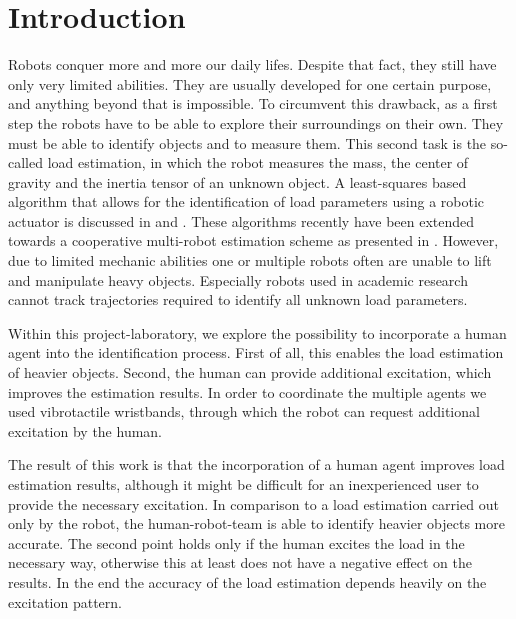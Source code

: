 \chapter{Introduction}
Robots conquer more and more our daily lifes. Despite that fact, they still have only very limited abilities. They are usually developed for one certain purpose, and anything beyond that is impossible. To circumvent this drawback, as a first step the robots have to be able to explore their surroundings on their own. They must be able to identify objects and to measure them. This second task is the so-called load estimation, in which the robot measures the mass, the center of gravity and the inertia tensor of an unknown object. A least-squares based algorithm that allows for the identification of load parameters using a robotic actuator is discussed in \cite{literaturstelle1} and \cite{literaturstelle2}. These algorithms recently have been extended towards a cooperative multi-robot estimation scheme as presented in \cite{literaturstelle3}. However, due to limited mechanic abilities one or multiple robots often are unable to lift and manipulate heavy objects. Especially robots used in academic research cannot track trajectories required to identify all unknown load parameters.

Within this project-laboratory, we explore the possibility to incorporate a human agent into the identification process. First of all, this enables the load estimation of heavier objects. Second, the human can provide additional excitation, which improves the estimation results. In order to coordinate the multiple agents we used vibrotactile wristbands, through which the robot can request additional excitation by the human.

The result of this work is that the incorporation of a human agent improves load estimation results, although it might be difficult for an inexperienced user to provide the necessary excitation. In comparison to a load estimation carried out only by the robot, the human-robot-team is able to identify heavier objects more accurate. The second point holds only if the human excites the load in the necessary way, otherwise this at least does not have a negative effect on the results. In the end the accuracy of the load estimation depends heavily on the excitation pattern.